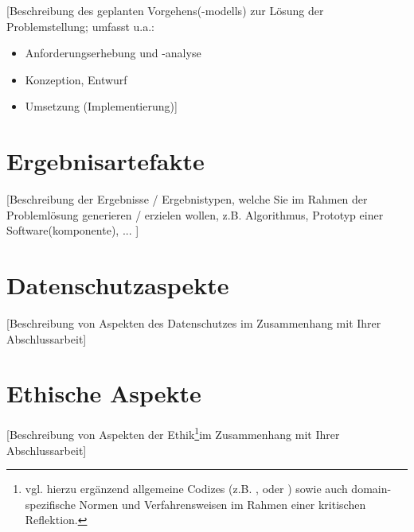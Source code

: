 [Beschreibung des geplanten Vorgehens(-modells) zur L\"osung der Problemstellung; umfasst u.a.:
\begin{itemize}
  \item Anforderungserhebung und -analyse
  \item Konzeption, Entwurf
  \item Umsetzung (Implementierung)]
\end{itemize}

\section{Ergebnisartefakte}
 [Beschreibung der Ergebnisse / Ergebnistypen, welche Sie im Rahmen der Probleml\"osung generieren / erzielen wollen, z.B. Algorithmus, Prototyp einer Software(komponente), ... ]

\section{Datenschutzaspekte}
 [Beschreibung von Aspekten des Datenschutzes im Zusammenhang mit Ihrer Abschlussarbeit]

\section{Ethische Aspekte}
 [Beschreibung von Aspekten der Ethik\footnote{vgl. hierzu erg\"anzend allgemeine Codizes (z.B. \autocite{acm}, \autocite{ieee} oder \autocite{gi}) sowie auch domain-spezifische Normen und Verfahrensweisen im Rahmen einer kritischen Reflektion.}im Zusammenhang mit Ihrer Abschlussarbeit]
